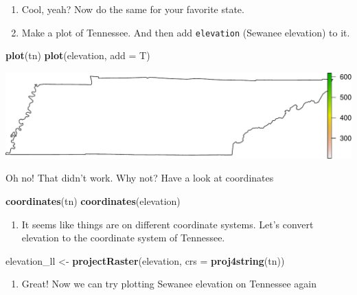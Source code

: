 \documentclass[
]{book}
\newenvironment{Shaded}{\begin{snugshade}}{\end{snugshade}}
\newcommand{\DataTypeTok}[1]{\textcolor[rgb]{0.13,0.29,0.53}{#1}}
\newcommand{\KeywordTok}[1]{\textcolor[rgb]{0.13,0.29,0.53}{\textbf{#1}}}
\newcommand{\NormalTok}[1]{#1}
\newcommand{\StringTok}[1]{\textcolor[rgb]{0.31,0.60,0.02}{#1}}
\providecommand{\tightlist}{%
  \setlength{\itemsep}{0pt}\setlength{\parskip}{0pt}}
\begin{document}
\begin{enumerate}
\def\labelenumi{\arabic{enumi}.}
\setcounter{enumi}{15}
\item
  Cool, yeah? Now do the same for your favorite state.
\item
  Make a plot of Tennessee. And then add \texttt{elevation} (Sewanee elevation) to it.
\end{enumerate}

\begin{Shaded}
\begin{Highlighting}[]
\KeywordTok{plot}\NormalTok{(tn)}
\KeywordTok{plot}\NormalTok{(elevation, }\DataTypeTok{add =}\NormalTok{ T)}
\end{Highlighting}
\end{Shaded}

\includegraphics{figures/unnamed-chunk-561-1.pdf}

Oh no! That didn't work. Why not? Have a look at coordinates

\begin{Shaded}
\begin{Highlighting}[]
\KeywordTok{coordinates}\NormalTok{(tn)}
\KeywordTok{coordinates}\NormalTok{(elevation)}
\end{Highlighting}
\end{Shaded}

\begin{enumerate}
\def\labelenumi{\arabic{enumi}.}
\setcounter{enumi}{17}
\tightlist
\item
  It seems like things are on different coordinate systems. Let's convert elevation to the coordinate system of Tennessee.
\end{enumerate}

\begin{Shaded}
\begin{Highlighting}[]
\NormalTok{elevation_ll <-}\StringTok{ }\KeywordTok{projectRaster}\NormalTok{(elevation, }\DataTypeTok{crs =} \KeywordTok{proj4string}\NormalTok{(tn))}
\end{Highlighting}
\end{Shaded}

\begin{enumerate}
\def\labelenumi{\arabic{enumi}.}
\setcounter{enumi}{18}
\tightlist
\item
  Great! Now we can try plotting Sewanee elevation on Tennessee again
\end{enumerate}
\end{document}
